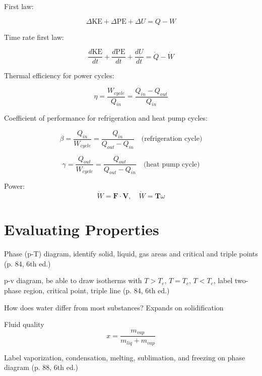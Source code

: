\documentclass[paper=letter, fontsize=11pt]{scrartcl}
\numberwithin{equation}{section}        %
\numberwithin{figure}{section}          %
\numberwithin{table}{section}               %
\begin{document}
First law:

\begin{equation}
    \Delta \text{KE} + \Delta \text{PE} + \Delta U = Q - W
\end{equation}

Time rate first law:

\begin{equation}
    \frac{d\text{KE}}{dt} + \frac{d\text{PE}}{dt} + \frac{dU}{dt} = \dot Q - \dot W
\end{equation}

Thermal efficiency for power cycles:

\begin{equation}
\eta = \frac{W_{cycle}}{Q_{in}} = \frac{Q_{in}-Q_{out}}{Q_{in}}
\end{equation}

Coefficient of performance for refrigeration and heat pump cycles:

\begin{equation}
\beta = \frac{Q_{in}}{W_{cycle}} = \frac{Q_{in}}{Q_{out}-Q_{in}}\quad\text{(refrigeration cycle)}
\end{equation}

\begin{equation}
\gamma = \frac{Q_{out}}{W_{cycle}} = \frac{Q_{out}}{Q_{out}-Q_{in}}\quad\text{(heat pump cycle)}
\end{equation}

Power:
\begin{equation}
    \dot W = \mathbf{F}\cdot\mathbf{V},\quad\dot W = \mathbf{T}\omega
\end{equation}


\newpage
\section{Evaluating Properties}

Phase (p-T) diagram, identify solid, liquid, gas areas and critical and triple points (p. 84, 6th ed.)

p-v diagram, be able to draw isotherms with $T>T_c$, $T=T_c$, $T<T_c$, label two-phase region, critical point, triple line (p. 84, 6th ed.)

How does water differ from most substances? Expands on solidification

Fluid quality 
\begin{equation}
    x = \frac{m_{vap}}{m_{liq}+m_{vap}}
\end{equation}

Label vaporization, condensation, melting, sublimation, and freezing on phase diagram (p. 88, 6th ed.)
\end{document}
